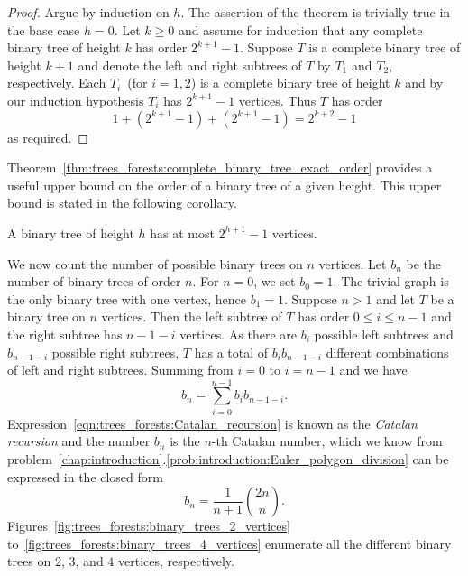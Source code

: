 \begin{proof}
Argue by induction on $h$. The assertion of the
theorem is trivially true in the base case $h = 0$. Let $k \geq 0$ and
assume for induction that any complete binary tree of height $k$ has
order $2^{k+1} - 1$. Suppose $T$ is a
complete binary tree of height $k + 1$ and
denote the left and right
subtrees of $T$ by $T_1$ and $T_2$, respectively. Each $T_i$~(for
$i = 1,2$) is a complete binary tree of
height $k$ and by our induction hypothesis $T_i$ has $2^{k+1} - 1$
vertices. Thus $T$ has order
\[
1 + (2^{k+1} - 1) + (2^{k+1} - 1)
=
2^{k+2} - 1
\]
as required.
\end{proof}

Theorem~\ref{thm:trees_forests:complete_binary_tree_exact_order}
provides a useful upper bound on the order of a
binary tree of a given height. This upper bound is
stated in the following corollary.

\begin{corollary}
A binary tree of height $h$ has at most $2^{h+1} - 1$ vertices.
\end{corollary}

We now count the number of possible binary trees on $n$
vertices. Let $b_n$ be the number of binary trees of order $n$. For
$n = 0$, we set $b_0 = 1$. The trivial graph is the only binary tree
with one vertex, hence $b_1 = 1$. Suppose $n > 1$ and let $T$ be a
binary tree on $n$ vertices. Then the left subtree of $T$ has order
$0 \leq i \leq n - 1$ and the right subtree has $n - 1 - i$
vertices. As there are $b_i$ possible left subtrees and $b_{n-1-i}$
possible right subtrees, $T$ has a total of $b_i b_{n-1-i}$ different
combinations of left and right subtrees. Summing from $i = 0$ to
$i = n - 1$ and we have
\begin{equation}
\label{eqn:trees_forests:Catalan_recursion}
b_n
=
\sum_{i=0}^{n-1} b_i b_{n-1-i}.
\end{equation}
Expression~\eqref{eqn:trees_forests:Catalan_recursion} is known as the
\emph{Catalan recursion} and the number $b_n$
is the $n$-th Catalan number, which we know from
problem~\ref{chap:introduction}.\ref{prob:introduction:Euler_polygon_division}
can be expressed in the closed form
\begin{equation}
\label{eqn:trees_forests:nth_Catalan_number_closed_form}
b_n
=
\frac{1}{n+1} \binom{2n}{n}.
\end{equation}
Figures~\ref{fig:trees_forests:binary_trees_2_vertices}
to~\ref{fig:trees_forests:binary_trees_4_vertices} enumerate all the
different binary trees on $2$, $3$, and $4$ vertices, respectively.

